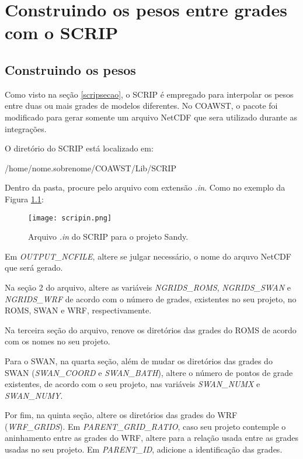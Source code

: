 \chapter{Construindo os pesos entre grades com o SCRIP}
\bigskip
\section{Construindo os pesos}
\bigskip
\noindent Como visto na seção \textcolor{bleu_cite}{\ref{scripsecao}}, o SCRIP é empregado para interpolar os pesos entre duas ou mais grades de modelos diferentes. No COAWST, o pacote foi modificado para gerar somente um arquivo NetCDF que sera utilizado durante as integrações.
\bigskip

\noindent O diretório do SCRIP está localizado em:
\bigskip

\begin{bashcode}
/home/nome.sobrenome/COAWST/Lib/SCRIP
\end{bashcode}
\bigskip

\noindent Dentro da pasta, procure pelo arquivo com extensão \textit{.in}. Como no exemplo da Figura \textcolor{bleu_cite}{\ref{scripinnedit}}:

\begin{figure}[H]
    \centering
    \texttt{[image: scripin.png]}
    \caption{Arquivo \textit{.in} do SCRIP para o projeto Sandy.}
    \label{scripinnedit}
\end{figure}
\bigskip

\noindent Em \textit{OUTPUT\_NCFILE}, altere se julgar necessário, o nome do arquvo NetCDF que será gerado.
\bigskip

\noindent Na seção 2 do arquivo, altere as variáveis \textit{NGRIDS\_ROMS}, \textit{NGRIDS\_SWAN} e \textit{NGRIDS\_WRF} de acordo com o número de grades, existentes no seu projeto, no ROMS, SWAN e WRF, respectivamente.
\bigskip

\noindent Na terceira seção do arquivo, renove os diretórios das grades do ROMS de acordo com os nomes no seu projeto.
\bigskip

\noindent Para o SWAN, na quarta seção, além de mudar os diretórios das grades do SWAN (\textit{SWAN\_COORD} e \textit{SWAN\_BATH}), altere o número de pontos de grade existentes, de acordo com o seu projeto, nas variáveis \textit{SWAN\_NUMX} e \textit{SWAN\_NUMY}.
\bigskip

\noindent Por fim, na quinta seção, altere os diretórios das grades do WRF (\textit{WRF\_GRIDS}). Em \textit{PARENT\_GRID\_RATIO}, caso seu projeto contemple o aninhamento entre as grades do WRF, altere para a relação usada entre as grades usadas no seu projeto. Em \textit{PARENT\_ID}, adicione a identificação das grades.
\bigskip

